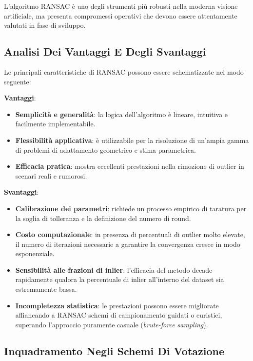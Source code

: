 ﻿\documentclass[11pt, a4paper]{article}
\begin{document}
L'algoritmo RANSAC è uno degli strumenti più robusti nella moderna visione artificiale, ma presenta compromessi operativi che devono essere attentamente valutati in fase di sviluppo.

\subsection{Analisi Dei Vantaggi E Degli Svantaggi}

Le principali caratteristiche di RANSAC possono essere schematizzate nel modo seguente:

\textbf{Vantaggi}:
\begin{itemize}[noitemsep]
    \item \textbf{Semplicità e generalità}: la logica dell'algoritmo è lineare, intuitiva e facilmente implementabile.
    \item \textbf{Flessibilità applicativa}: è utilizzabile per la risoluzione di un'ampia gamma di problemi di adattamento geometrico e stima parametrica.
    \item \textbf{Efficacia pratica}: mostra eccellenti prestazioni nella rimozione di outlier in scenari reali e rumorosi.
\end{itemize}

\textbf{Svantaggi}:
\begin{itemize}[noitemsep]
    \item \textbf{Calibrazione dei parametri}: richiede un processo empirico di taratura per la soglia di tolleranza e la definizione del numero di round.
    \item \textbf{Costo computazionale}: in presenza di percentuali di outlier molto elevate, il numero di iterazioni necessarie a garantire la convergenza cresce in modo esponenziale.
    \item \textbf{Sensibilità alle frazioni di inlier}: l'efficacia del metodo decade rapidamente qualora la percentuale di inlier all'interno del dataset sia estremamente bassa.
    \item \textbf{Incompletezza statistica}: le prestazioni possono essere migliorate affiancando a RANSAC schemi di campionamento guidati o euristici, superando l'approccio puramente casuale (\emph{brute-force sampling}).
\end{itemize}

\subsection{Inquadramento Negli Schemi Di Votazione}
\end{document}
